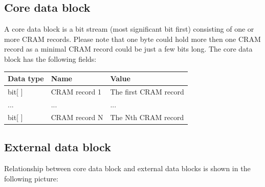 \documentclass[a4paper]{article}
\begin{document}
%
% 


\subsection{\textbf{Core data block}}

A core data block is a bit stream (most significant bit first) consisting of one 
or more CRAM records. Please note that one byte could hold more then one CRAM record 
as a minimal CRAM record could be just a few bits long. The core data block has 
the following fields:

\begin{tabular}{|l|>{\raggedright}p{120pt}|>{\raggedright}p{260pt}|}
\hline
\textbf{Data type} & \textbf{Name} & \textbf{Value}
\tabularnewline
\hline
bit[ ] & CRAM record 1 & The first CRAM record\tabularnewline
\hline
... & ... & ...\tabularnewline
\hline
bit[ ] & CRAM record N & The Nth CRAM record \tabularnewline
\hline
\end{tabular}

\subsection{\textbf{External data block}}

Relationship between core data block and external data blocks is shown in the following 
picture: 
\end{document}
